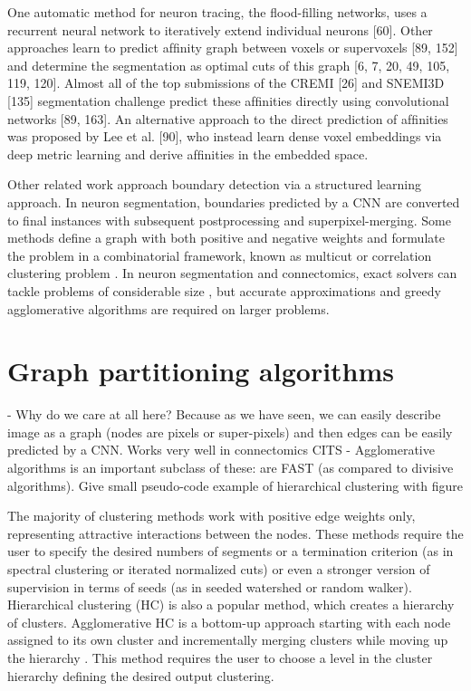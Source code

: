 One automatic method for neuron tracing, the ﬂood-ﬁlling networks, uses a recurrent neural network to iteratively extend individual neurons [60]. Other approaches learn to predict afﬁnity graph between voxels or supervoxels [89, 152] and determine the segmentation as optimal cuts of this graph [6, 7, 20, 49, 105, 119, 120]. Almost all of the top submissions of the CREMI [26] and SNEMI3D [135] segmentation challenge predict these afﬁnities directly using convolutional networks [89, 163]. An alternative approach to the direct prediction of afﬁnities was proposed by Lee et al. [90], who instead learn dense voxel embeddings via deep metric learning and derive afﬁnities in the embedded space.







Other related work \cite{funke2018large,turaga2009maximin} approach boundary detection via a structured learning approach.
In neuron segmentation, boundaries predicted by a CNN are converted to final instances with subsequent postprocessing and superpixel-merging.
Some methods define a graph with both positive and negative weights and formulate the problem in a combinatorial framework, known as multicut or correlation clustering problem \cite{chopra1991multiway}. 
In neuron segmentation and connectomics, exact solvers can tackle problems of considerable size \cite{andres2012globally}, but accurate approximations \cite{pape2017solving,yarkony2012fast} and greedy agglomerative algorithms \cite{levinkov2017comparative,wolf2019mutex,bailoni2019generalized} are required on larger problems.


\section{Graph partitioning algorithms}
- Why do we care at all here? Because as we have seen, we can easily describe image as a graph (nodes are pixels or super-pixels) and then edges can be easily predicted by a CNN. Works very well in connectomics CITS
- Agglomerative algorithms is an important subclass of these: are FAST (as compared to divisive algorithms). Give small pseudo-code example of hierarchical clustering with figure

The majority of clustering methods work with positive edge weights only, representing attractive interactions between the nodes. These methods require the user to specify the desired numbers of segments or a termination criterion (as in spectral clustering or iterated normalized cuts) or even a stronger version of supervision in terms of seeds (as in seeded watershed or random walker).  
Hierarchical clustering (HC) is also a popular method, which creates a hierarchy of clusters. Agglomerative HC is a bottom-up approach starting with each node assigned to its own cluster and incrementally merging clusters while moving up the hierarchy \cite{lance1967general}. This method requires the user to choose a level in the cluster hierarchy defining the desired output clustering. 

